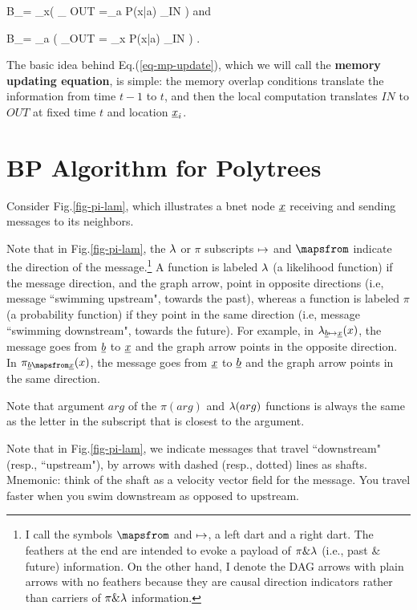 \beq
B_\pi=
\prod_{x}\indi\left(
_
{OUT}
=\sum_a P(x|a)
_{IN}
\right)
\eeq
and

\beq
B_\lam=
\prod_{a}
\indi\left(
_{OUT}
=
\sum_x P(x|a)
_{IN}
\right)
\;.
\eeq

The basic idea behind Eq.(\ref{eq-mp-update}),
which we will call the
{\bf memory updating equation}, is simple:
the memory overlap conditions translate the information
from time $t-1$ to $t$, and
then the local computation translates 
$IN$ to $OUT$ at fixed time $t$
and location ${\underline{x}}_i$.




\section*{BP Algorithm for Polytrees}


Consider Fig.\ref{fig-pi-lam},
which illustrates
a bnet node ${\underline{x}}$ receiving and sending
messages to its neighbors.

Note that in Fig.\ref{fig-pi-lam},
the $\lambda$ or $\pi$
subscripts $\mapsto$
and $\ldart$
indicate  the direction of the
 message.\footnote{I call 
the symbols $\ldart$ and
$\mapsto$,
a left dart and a right dart.
The feathers at the end 
are intended to evoke
a payload of
$\pi \& \lambda$ 
 (i.e., past \& future) information.
On the other hand, 
I denote the DAG arrows with 
plain arrows 
with no feathers because they are
causal direction indicators 
rather than
carriers of $\pi\& \lambda$ information.}
A function is labeled
$\lambda$ (a likelihood
function)  if the
message direction,
 and the  graph arrow,
 point in opposite directions
(i.e, message ``swimming upstream",
towards the past),
whereas a
function is labeled $\pi$
(a probability function)  if
they point in the same direction
(i.e, message ``swimming downstream",
towards  the future).
For example, in
$\lambda_{{\underline{b}}\mapsto{\underline{x}}}(x)$,
the message goes from
${\underline{b}}$ to ${\underline{x}}$ and the
graph arrow
points in the opposite direction.
In
$\pi_{\rvb\ldart\rvx}(x)$,
the message goes from
${\underline{x}}$ to ${\underline{b}}$ and the
graph arrow
points in the same direction.

Note that argument $arg$ of the $\pi(arg)$
and $\lambda(arg)$
functions is always the same
as the letter in the subscript
that is closest to the argument.

Note that in Fig.\ref{fig-pi-lam},
we indicate
messages that travel
``downstream"
(resp., ``upstream"), by
arrows with dashed (resp., dotted)
 lines as shafts.
Mnemonic: think of the shaft as a
 velocity vector field
for the message.
You travel faster when
you swim downstream as opposed
to upstream.


